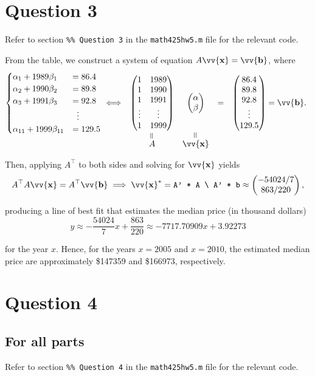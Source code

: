 \documentclass[12pt]{article}
\newcommand{\veq}{\mathrel{\rotatebox{90}{$=$}}}
\newcommand{\vect}[1]{\vv{\mathbf{#1}}}
\newcommand{\code}[1]{\texttt{#1}}
\begin{document}
\section*{Question 3}

Refer to section \code{\%\% Question 3} in the \code{math425hw5.m} file for the relevant code.

From the table, we construct a system of equation $A\vect{x}=\vect{b}$, where
$$
\begin{cases}
    \alpha_1 + 1989\beta_1 &= 86.4 \\
    \alpha_2 + 1990\beta_2 &= 89.8 \\
    \alpha_3 + 1991\beta_3 &= 92.8 \\
    &\vdotswithin{=} \\
    \alpha_{11} + 1999\beta_{11} &= 129.5 \\
\end{cases}
\iff
\begin{array}[t]{cccc}
\begin{pmatrix}
    1 & 1989 \\
    1 & 1990 \\
    1 & 1991 \\
    \vdots & \vdots\\
    1 & 1999
\end{pmatrix}
&
\begin{pmatrix}
    \alpha \\ \beta
\end{pmatrix}
&
=
&
\begin{pmatrix}
    86.4 \\
    89.8 \\
    92.8 \\
    \vdots \\
    129.5
\end{pmatrix}
=\vect{b}.
\\
\overset{\veq}{A} & \overset{\veq}{\vect{x}}
\end{array}
$$

Then, applying $A^\top$ to both sides and solving for $\vect{x}$ yields
$$
A^\top A\vect{x}=A^\top\vect{b} \implies
\vect{x}^* = \verb|A' * A \ A' * b| \approx
\begin{pmatrix}
    -54024/7   \\  
     863/220  \\
\end{pmatrix},
$$

producing a line of best fit that estimates the median price (in thousand dollars)
$$
y \approx -\frac{54024}{7}x + \frac{863}{220} \approx -7717.70909x + 3.92273
$$

for the year $x$. Hence, for the years $x=2005$ and $x=2010$, the estimated median price are approximately \$147359 and \$166973, respectively.

\section*{Question 4}

\subsection*{For all parts}

Refer to section \code{\%\% Question 4} in the \code{math425hw5.m} file for the relevant code.
\end{document}
